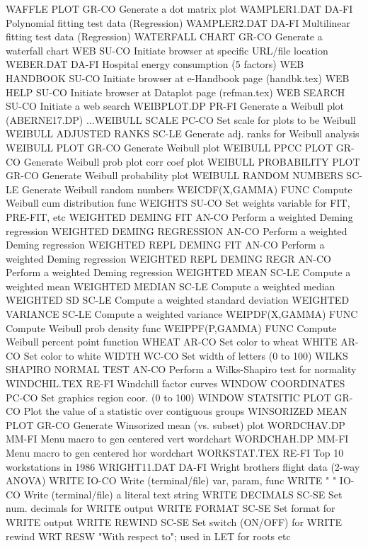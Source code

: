 WAFFLE PLOT                 GR-CO Generate a dot matrix plot
WAMPLER1.DAT                DA-FI Polynomial fitting test data (Regression)
WAMPLER2.DAT                DA-FI Multilinear fitting test data (Regression)
WATERFALL CHART             GR-CO Generate a waterfall chart
WEB                         SU-CO Initiate browser at specific URL/file location
WEBER.DAT                   DA-FI Hospital energy consumption (5 factors)
WEB HANDBOOK                SU-CO Initiate browser at e-Handbook page (handbk.tex)
WEB HELP                    SU-CO Initiate browser at Dataplot page (refman.tex)
WEB SEARCH                  SU-CO Initiate a web search
WEIBPLOT.DP                 PR-FI Generate a Weibull plot (ABERNE17.DP)
...WEIBULL SCALE            PC-CO Set scale for plots to be Weibull
WEIBULL ADJUSTED RANKS      SC-LE Generate adj. ranks for Weibull analysis
WEIBULL PLOT                GR-CO Generate Weibull plot
WEIBULL PPCC PLOT           GR-CO Generate Weibull prob plot corr coef plot
WEIBULL PROBABILITY PLOT    GR-CO Generate Weibull probability plot
WEIBULL RANDOM NUMBERS      SC-LE Generate Weibull random numbers
WEICDF(X,GAMMA)             FUNC  Compute Weibull cum distribution func
WEIGHTS                     SU-CO Set weights variable for FIT, PRE-FIT, etc
WEIGHTED DEMING FIT         AN-CO Perform a weighted Deming regression
WEIGHTED DEMING REGRESSION  AN-CO Perform a weighted Deming regression
WEIGHTED REPL DEMING FIT    AN-CO Perform a weighted Deming regression
WEIGHTED REPL DEMING REGR   AN-CO Perform a weighted Deming regression
WEIGHTED MEAN               SC-LE Compute a weighted mean
WEIGHTED MEDIAN             SC-LE Compute a weighted median
WEIGHTED SD                 SC-LE Compute a weighted standard deviation
WEIGHTED VARIANCE           SC-LE Compute a weighted variance
WEIPDF(X,GAMMA)             FUNC  Compute Weibull prob density func
WEIPPF(P,GAMMA)             FUNC  Compute Weibull percent point function
WHEAT                       AR-CO Set color to wheat
WHITE                       AR-CO Set color to white
WIDTH                       WC-CO Set width of letters (0 to 100)
WILKS SHAPIRO NORMAL TEST   AN-CO Perform a Wilks-Shapiro test for normality
WINDCHIL.TEX                RE-FI Windchill factor curves
WINDOW COORDINATES          PC-CO Set graphics region coor. (0 to 100)
WINDOW STATSITIC PLOT       GR-CO Plot the value of a statistic over contiguous groups
WINSORIZED MEAN PLOT        GR-CO Generate Winsorized mean (vs. subset) plot
WORDCHAV.DP                 MM-FI Menu macro to gen centered vert wordchart
WORDCHAH.DP                 MM-FI Menu macro to gen centered hor wordchart
WORKSTAT.TEX                RE-FI Top 10 workstations in 1986
WRIGHT11.DAT                DA-FI Wright brothers flight data (2-way ANOVA)
WRITE                       IO-CO Write (terminal/file) var, param, func
WRITE "  "                  IO-CO Write (terminal/file) a literal text string
WRITE DECIMALS              SC-SE Set num. decimals for WRITE output
WRITE FORMAT                SC-SE Set format for WRITE output
WRITE REWIND                SC-SE Set switch (ON/OFF) for WRITE rewind
WRT                         RESW  "With respect to"; used in LET for roots etc

